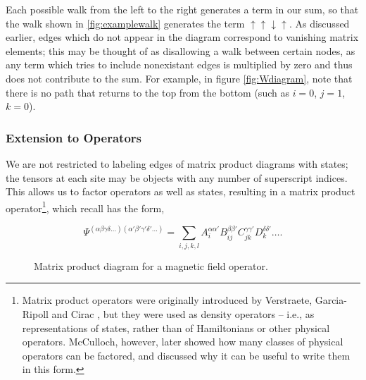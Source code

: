 \documentclass{amsbook}
\theoremstyle{plain}
\theoremstyle{definition}
\theoremstyle{remark}
\begin{document}
Each possible walk from the left to the right generates a term in our sum, so that the walk shown in \ref{fig:examplewalk} generates the term $\uparrow\uparrow\downarrow\uparrow$.  As discussed earlier, edges which do not appear in the diagram correspond to vanishing matrix elements;  this may be thought of as disallowing a walk between certain nodes, as any term which tries to include nonexistant edges is multiplied by zero and thus does not contribute to the sum.  For example, in figure \ref{fig:Wdiagram}, note that there is no path that returns to the top from the bottom (such as $i=0$, $j=1$, $k=0$).
\subsubsection{Extension to Operators}

We are not restricted to labeling edges of matrix product diagrams with states;  the tensors at each site may be objects with any number of superscript indices.  This allows us to factor operators as well as states, resulting in a matrix product operator\footnote{Matrix product operators were originally introduced by Verstraete, Garcia-Ripoll and Cirac \cite{cond-mat/0406426}, but they were used as density operators -- i.e., as representations of states, rather than of Hamiltonians or other physical operators.  McCulloch, however, later showed how many classes of physical operators can be factored, and discussed why it can be useful to write them in this form\cite{cond-mat/0701428}.}, which recall has the form,

$$\Psi^{(\alpha\beta\gamma\delta\dots)(\alpha'\beta'\gamma'\delta'\dots)} = \sum_{i,j,k,l} A_i^{\alpha\alpha'} B_{ij}^{\beta\beta'} C_{jk}^{\gamma\gamma'} D_{k}^{\delta\delta'} \dots.$$

\begin{figure}
\caption{Matrix product diagram for a magnetic field operator. \label{fig:magfield}}
\end{figure}
\end{document}
